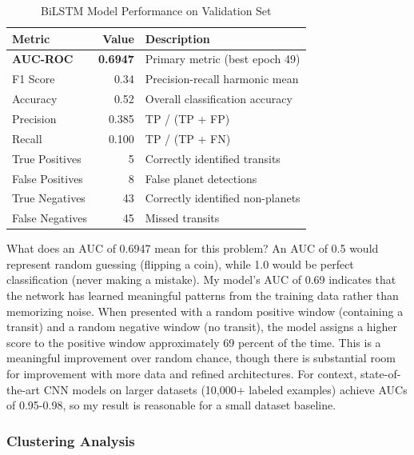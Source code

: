 \documentclass[letterpaper]{article} %
\begin{document}
\begin{table}[h]
\centering
\caption{BiLSTM Model Performance on Validation Set}
\label{tab:bilstm_performance}
\begin{tabular}{@{}lrl@{}}
\toprule
\textbf{Metric} & \textbf{Value} & \textbf{Description} \\
\midrule
\textbf{AUC-ROC} & \textbf{0.6947} & Primary metric (best epoch 49) \\
F1 Score & 0.34 & Precision-recall harmonic mean \\
Accuracy & 0.52 & Overall classification accuracy \\
Precision & 0.385 & TP / (TP + FP) \\
Recall & 0.100 & TP / (TP + FN) \\
True Positives & 5 & Correctly identified transits \\
False Positives & 8 & False planet detections \\
True Negatives & 43 & Correctly identified non-planets \\
False Negatives & 45 & Missed transits \\
\bottomrule
\end{tabular}
\end{table}

What does an AUC of 0.6947 mean for this problem? An AUC of 0.5 would represent random guessing (flipping a coin), while 1.0 would be perfect classification (never making a mistake). My model's AUC of 0.69 indicates that the network has learned meaningful patterns from the training data rather than memorizing noise. When presented with a random positive window (containing a transit) and a random negative window (no transit), the model assigns a higher score to the positive window approximately 69 percent of the time. This is a meaningful improvement over random chance, though there is substantial room for improvement with more data and refined architectures. For context, state-of-the-art CNN models on larger datasets (10,000+ labeled examples) achieve AUCs of 0.95-0.98, so my result is reasonable for a small dataset baseline.

\subsubsection{Clustering Analysis}
\end{document}
